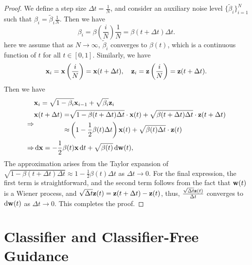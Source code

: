 \begin{proof}
    We define a step size \(\Delta t=\frac{1}{N}\), and consider an auxiliary noise level \(\{\tilde{\beta}_{i}\}_{i=1}^{N}\) such that \(\beta_{i}=\tilde{\beta}_{i}\frac{1}{N}\). Then we have
    \begin{equation*}
        \beta_{i}=\beta\left(\frac{i}{N}\right)\frac{1}{N}=\beta(t+\Delta t)\Delta t.
    \end{equation*}
    here we assume that as \(N\to\infty\), \(\tilde{\beta}_{i}\) converges to \(\beta(t)\), which is a continuous function of \(t\) for all \(t\in[0,1]\). Similarly, we have
    \begin{equation*}
        {\bf x}_{i}={\bf x}\left(\frac{i}{N}\right)={\bf x}(t+\Delta t),\quad{\bf z}_{i}={\bf z}\left(\frac{i}{N}\right)={\bf z}(t+\Delta t).
    \end{equation*}
    Then we have
    \begin{equation*}
        \begin{aligned}
        &{\bf x}_{i}=\sqrt{1-\beta_{i}}{\bf x}_{i-1}+\sqrt{\beta_{i}}{\bf z}_{i}\\
        \Rightarrow&\begin{aligned}
            {\bf x}(t+\Delta t)=&\sqrt{1-\beta(t+\Delta t)\Delta t}\cdot{\bf x}(t)+\sqrt{\beta(t+\Delta t)\Delta t}\cdot{\bf z}(t+\Delta t)\\
            \approx&\left(1-\frac{1}{2}\beta(t)\Delta t\right){\bf x}(t)+\sqrt{\beta(t)\Delta t}\cdot{\bf z}(t)
        \end{aligned}\\
        \Rightarrow&\mathop{}\!\mathrm{d}{\bf x}=-\frac{1}{2}\beta(t){\bf x}\mathop{}\!\mathrm{d} t+\sqrt{\beta(t)}\mathop{}\!\mathrm{d}{\bf w}(t),
        \end{aligned}
    \end{equation*}
    The approximation arises from the Taylor expansion of \(\sqrt{1-\beta(t+\Delta t)\Delta t}\approx 1-\frac{1}{2}\beta(t)\Delta t\) as \(\Delta t\to0\). For the final expression, the first term is straightforward, and the second term follows from the fact that \({\bf w}(t)\) is a Wiener process, and \(\sqrt{\Delta t}{\bf z}(t)={\bf z}(t+\Delta t)-{\bf z}(t)\), thus, \(\frac{\sqrt{\Delta t}{\bf z}(t)}{\Delta t}\) converges to \(\mathop{}\!\mathrm{d}{\bf w}(t)\) as \(\Delta t\to0\).
    This completes the proof.
\end{proof}


\section{Classifier and Classifier-Free Guidance}

